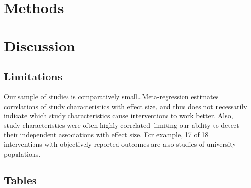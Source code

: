 \documentclass[sn-nature,referee,pdflatex]{sn-jnl}
\begin{document}
\section{Methods}\label{sec3}

\section{Discussion}\label{discussion}

\subsection{Limitations}\label{limitations}

Our sample of studies is comparatively small\ldots Meta-regression
estimates correlations of study characteristics with effect size, and
thus does not necessarily indicate which study characteristics cause
interventions to work better. Also, study characteristics were often
highly correlated, limiting our ability to detect their independent
associations with effect size. For example, 17 of 18 interventions with
objectively reported outcomes are also studies of university
populations.

\subsection{Tables}\label{tables}
\end{document}
